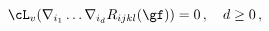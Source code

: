 \begin{equation}
\cL_v( \nabla_{i_1} \ldots \nabla_{i_d} R_{ijkl}(\gf)) =0\,,
\quad d \geq 0\,,
\label{Lie_cdRm}
\end{equation} 
